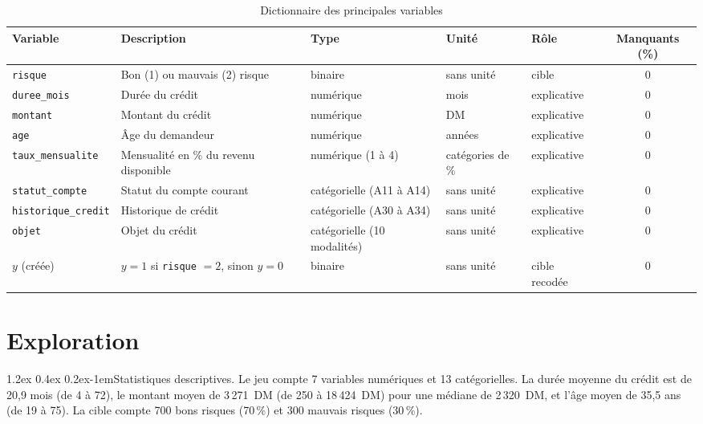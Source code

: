 \documentclass[11pt,a4paper]{article}
\makeatletter
\renewcommand\paragraph{\@startsection{paragraph}{4}{\z@}%
  {1.2ex \@plus 0.4ex \@minus 0.2ex}{-1em}{\normalfont\normalsize\bfseries}}
\makeatother
\begin{document}
\begin{table}[htbp]
  \centering
  \caption{Dictionnaire des principales variables}
  \label{tab:dictionnaire}
  \small
  \begin{tabular}{@{}l P{5.6cm} l l l c@{}}
    \toprule
    Variable & Description & Type & Unité & Rôle & Manquants (\%) \\
    \midrule
    \texttt{risque} & Bon (1) ou mauvais (2) risque & binaire & sans unité & cible & 0 \\
    \texttt{duree\_mois} & Durée du crédit & numérique & mois & explicative & 0 \\
    \texttt{montant} & Montant du crédit & numérique & DM & explicative & 0 \\
    \texttt{age} & Âge du demandeur & numérique & années & explicative & 0 \\
    \texttt{taux\_mensualite} & Mensualité en \% du revenu disponible & numérique (1 à 4) & catégories de \% & explicative & 0 \\
    \texttt{statut\_compte} & Statut du compte courant & catégorielle (A11 à A14) & sans unité & explicative & 0 \\
    \texttt{historique\_credit} & Historique de crédit & catégorielle (A30 à A34) & sans unité & explicative & 0 \\
    \texttt{objet} & Objet du crédit & catégorielle (10 modalités) & sans unité & explicative & 0 \\
    $y$ (créée) & $y = 1$ si \texttt{risque} $= 2$, sinon $y = 0$ & binaire & sans unité & cible recodée & 0 \\
    \bottomrule
  \end{tabular}
\end{table}

\section{Exploration}
\label{sec:exploration}
\paragraph{Statistiques descriptives.} Le jeu compte 7 variables numériques et 13 catégorielles. La durée moyenne du crédit est de 20,9 mois (de 4 à 72), le montant moyen de 3\,271~DM (de 250 à 18\,424~DM) pour une médiane de 2\,320~DM, et l'âge moyen de 35,5 ans (de 19 à 75). La cible compte 700 bons risques (70\,\%) et 300 mauvais risques (30\,\%).
\end{document}
